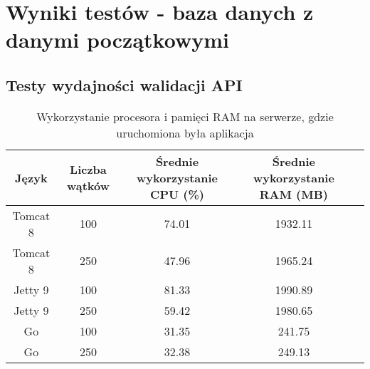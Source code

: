  \newpage
 \section{Wyniki testów - baza danych z danymi początkowymi}
 \subsection{Testy wydajności walidacji API}

 \clearpage

\begin{table}[!htb]
\centering
\caption{Wykorzystanie procesora i pamięci RAM na serwerze, gdzie uruchomiona była aplikacja}
\label{tab:app-full-api}
\begin{tabular}{@{}ccccl@{}}
\toprule
\textbf{Język} & \textbf{Liczba wątków} & \multicolumn{1}{p{3cm}}{\textbf{Średnie wykorzystanie CPU (\%)}} & \multicolumn{1}{p{3cm}}{\textbf{Średnie wykorzystanie RAM (MB)}} &  \\ \midrule
Tomcat 8       & 100                    & 74.01                             & 1932.11                          &  \\
Tomcat 8       & 250                    & 47.96                             & 1965.24                          &  \\
Jetty 9       & 100                    & 81.33                             & 1990.89                          &  \\
Jetty 9       & 250                    & 59.42                             & 1980.65                          &  \\
Go       & 100                    & 31.35                             & 241.75                          &  \\
Go       & 250                    & 32.38                             & 249.13                          &  \\
\bottomrule
\end{tabular}
\end{table}


